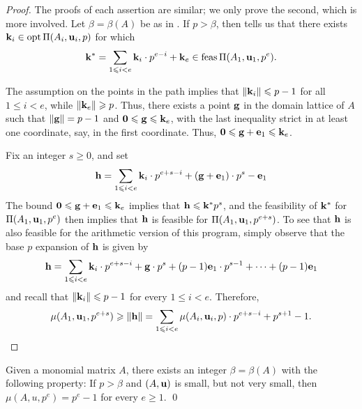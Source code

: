 \documentclass[11pt]{amsart}
\begin{document}
\begin{proof} The proofs of each assertion are similar; we only prove the second, which is more involved.  Let $\beta = \beta(A)$ be as in .  If $p > \beta$, then  tells us that there exists $\mathbf{k}_i \in \operatorname{opt} \Pi(A_i, \mathbf{u}_i, p)$ for which \[ \mathbf{k}^{\ast} = \sum_{1 \leqslant i < e} \mathbf{k}_i \cdot p^{e-i} + \mathbf{k}_e \in \operatorname{feas} \Pi(A_1, \mathbf{u}_1, p^e).\]

  The assumption on the points in the path implies that $\| \mathbf{k}_i \| \leqslant p-1$ for all $1 \leq i < e$, while $\| \mathbf{k}_e \| \geqslant p$.  Thus, there exists a point $\mathbf{g}$ in the domain lattice of $A$ such that $\| \mathbf{g} \| = p-1$ and $\mathbf{0} \leqslant \mathbf{g} \leqslant \mathbf{k}_e$, with the last inequality strict in at least one coordinate, say, in the first coordinate.  Thus, $\mathbf{0} \leqslant \mathbf{g} + \mathbf{e}_1 \leqslant \mathbf{k}_e$.

Fix an integer $s \geq 0$, and set   
%
\[ \mathbf{h} = \sum_{1 \leqslant i < e} \mathbf{k}_i \cdot p^{e+s-i} + (\mathbf{g} + \mathbf{e}_1) \cdot p^{s} - \mathbf{e}_1 \]
%
The bound $\mathbf{0} \leqslant \mathbf{g} + \mathbf{e}_1 \leqslant \mathbf{k}_e$ implies that $\mathbf{h} \leqslant \mathbf{k}^{\ast}  p^s$, and the feasibility of $\mathbf{k}^{\ast}$ for $\Pi(A_1, \mathbf{u}_1, p^e)$ then implies that  $\mathbf{h}$ is feasible for $\Pi(A_1, \mathbf{u}_1, p^{e+s})$.  To see that $\mathbf{h}$ is also feasible for the arithmetic version of this program, simply observe that the base $p$ expansion of $\mathbf{h}$ is given by 
%
\[ \mathbf{h} = \sum_{1 \leqslant i < e} \mathbf{k}_i \cdot p^{e+s-i} + \mathbf{g} \cdot p^{s} + (p-1) \mathbf{e}_1 \cdot p^{s-1} + \cdots + (p-1) \mathbf{e}_1 \]
%
and recall that $\| \mathbf{k}_i \| \leqslant p-1$ for every $1 \leq i < e$.  Therefore, 
%
\[ \mu(A_1, \mathbf{u}_1, p^{e+s}) \geqslant \| \mathbf{h} \| = \sum_{1 \leqslant i < e} \mu(A_i, \mathbf{u}_i, p) \cdot p^{e+s-i}+ p^{s+1}-1. \qedhere\]
%
\end{proof}

\begin{corollary}
   Given a monomial matrix $A$, there exists an integer $\beta = \beta(A)$ with the following property\textup: If $p > \beta$ and $(A, \mathbf{u})$ is small, but not very small, then $\mu(A,u,p^e) = p^e-1$ for every $e \geq 1$.
   \qed
\end{corollary}
\end{document}
